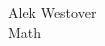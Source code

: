 \documentclass{article}[11pt]
\begin{document}
\begin{center}
\begin{Large}
	Alek Westover \\
	\vspace{2mm}
	Math 
\end{Large}
\end{center}
\thispagestyle{empty}
\end{document}
